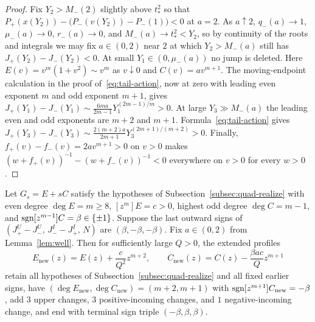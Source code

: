 \begin{proof}
Fix $Y_2>M_-(2)$ slightly above $t_*^2$ so that $P_+(x(Y_2))-\big(P_-(v(Y_2))-P_-(1)\big)<0$ at $a=2$. As $a\uparrow 2$, $q_-(a)\to 1$, $\mu_-(a)\to 0$, $r_-(a)\to 0$, and $M_-(a)\to t_*^2<Y_2$, so by continuity of the roots and integrals we may fix $a\in(0,2)$ near $2$ at which $Y_2>M_-(a)$ still has $J_+(Y_2)-J_-(Y_2)<0$. At small $Y_1\in(0,\mu_-(a))$ no jump is deleted. Here $E(v)=v^m(1+v^2)\sim v^m$ as $v\downarrow0$ and $C(v)=av^{m+1}$. The moving-endpoint calculation in the proof of~\eqref{eq:tail-action}, now at zero with leading even exponent $m$ and odd exponent $m+1$, gives $J_+(Y_1)-J_-(Y_1)\sim \frac{6ma}{2m-1}Y_1^{(2m-1)/m}>0$. At large $Y_3\gg M_-(a)$ the leading even and odd exponents are $m+2$ and $m+1$. Formula~\eqref{eq:tail-action} gives $J_+(Y_3)-J_-(Y_3)\sim\frac{2(m+2)a}{2m+1}Y_3^{(2m+1)/(m+2)}>0$. Finally, $f_+(v)-f_-(v)=2av^{m+1}>0$ on $v>0$ makes $(w+f_+(v))^{-1}-(w+f_-(v))^{-1}<0$ everywhere on $v>0$ for every $w>0$.
\end{proof}

\begin{proposition}\label{prop:well-step}
Let $G_s=E+sC$ satisfy the hypotheses of Subsection~\ref{subsec:quad-realize} with even degree $\deg E=m\ge 8$, $[z^m]E=c>0$, highest odd degree $\deg C=m-1$, and $\operatorname{sgn}[z^{m-1}]C=\beta\in\{\pm 1\}$. Suppose the last outward signs of $(J_+^U-J_-^U,\,J_-^I-J_+^I,\,N)$ are $(\beta,-\beta,-\beta)$. Fix $a\in(0,2)$ from Lemma~\ref{lem:well}. Then for sufficiently large $Q>0$, the extended profiles
\begin{equation}\label{eq:well-append}
  E_{\mathrm{new}}(z) = E(z) + \frac{c}{Q^2}z^{m+2},\qquad
  C_{\mathrm{new}}(z) = C(z) - \frac{\beta ac}{Q}z^{m+1}
\end{equation}
retain all hypotheses of Subsection~\ref{subsec:quad-realize} and all fixed earlier signs, have $(\deg E_{\mathrm{new}},\deg C_{\mathrm{new}})=(m+2,m+1)$ with $\operatorname{sgn}[z^{m+1}]C_{\mathrm{new}}=-\beta$, add $3$ upper changes, $3$ positive-incoming changes, and $1$ negative-incoming change, and end with terminal sign triple $(-\beta,\beta,\beta)$.
\end{proposition}

